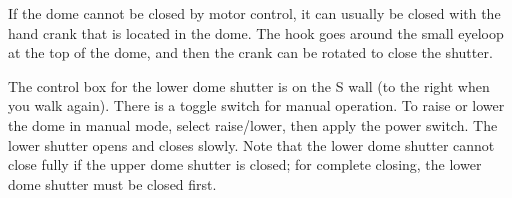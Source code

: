 \documentclass{article}
\begin{document}
If the dome cannot be closed by motor control, it can usually be closed with
the hand crank that is located in the dome. The hook goes around the small
eyeloop at the top of the dome, and then the crank can be rotated to close
the shutter. 

The control box for the lower dome shutter is on the S wall (to the right
when you walk again). There is a toggle switch for manual operation. To
raise or lower the dome in manual mode, select raise/lower, then apply
the power switch. The lower shutter opens and closes slowly. Note that
the lower dome shutter cannot close fully if the upper dome shutter is
closed; for complete closing, the lower dome shutter must be closed first.
\end{document}
